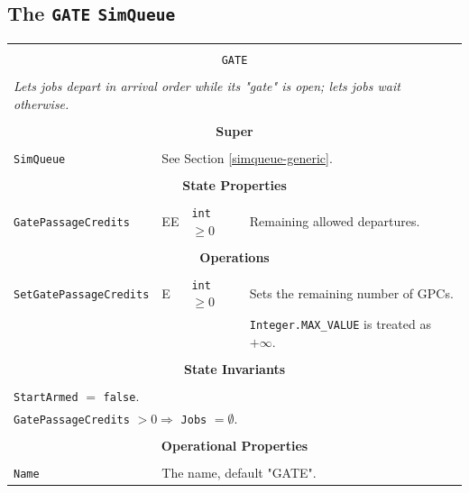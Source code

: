 \documentclass[12pt]{book}
\begin{document}
\subsection{The \lstinline{GATE} \lstinline{SimQueue}}

\begin{tabular}{|l|l|l|l|}
\hline
\multicolumn{4}{|c|}{} \\
\multicolumn{4}{|c|}{\lstinline[basicstyle=\large]{GATE}} \\
\multicolumn{4}{|c|}{} \\
\hline
\multicolumn{4}{|l|}{\em Lets jobs depart in arrival order while its "gate" is open; lets jobs wait otherwise.} \\
\hline
\multicolumn{4}{|c|}{} \\
\multicolumn{4}{|c|}{\bf Super} \\
\multicolumn{4}{|c|}{} \\
\hline
\lstinline|SimQueue| & \multicolumn{3}{|l|}{See Section \ref{simqueue-generic}.} \\
\hline
\multicolumn{4}{|c|}{} \\
\multicolumn{4}{|c|}{\bf State Properties} \\
\multicolumn{4}{|c|}{} \\
\hline
\lstinline|GatePassageCredits| & EE & \lstinline|int| $\geq 0$ & Remaining allowed departures. \\
\hline
\multicolumn{4}{|c|}{} \\
\multicolumn{4}{|c|}{\bf Operations} \\
\multicolumn{4}{|c|}{} \\
\hline
\lstinline|SetGatePassageCredits| & E & \lstinline|int| $\geq 0$ & Sets the remaining number of GPCs. \\
                                  &   &                          & \lstinline|Integer.MAX_VALUE| is treated as $+\infty$. \\
\hline
\multicolumn{4}{|c|}{} \\
\multicolumn{4}{|c|}{\bf State  Invariants} \\
\multicolumn{4}{|c|}{} \\
\hline
\multicolumn{4}{|l|}{\lstinline|StartArmed| $=$ \lstinline|false|.} \\
\multicolumn{4}{|l|}{\lstinline|GatePassageCredits| $> 0 \Rightarrow$ \lstinline|Jobs| $= \emptyset$.} \\
\hline
\multicolumn{4}{|c|}{} \\
\multicolumn{4}{|c|}{\bf Operational Properties} \\
\multicolumn{4}{|c|}{} \\
\hline
\lstinline|Name| & \multicolumn{3}{|l|}{The name, default "GATE".} \\
\hline
\end{tabular}
\end{document}
